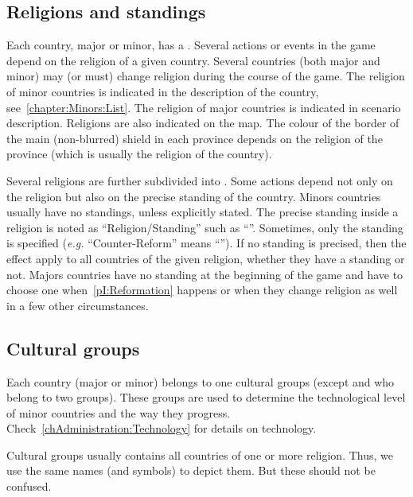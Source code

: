\label{chThePowers:Religions}



\subsection{Religions and standings}

\aparag Each country, major or minor, has a .
\bparag Several actions or events in the game depend on the religion of a
given country.
\bparag Several countries (both major and minor) may (or must) change religion
during the course of the game.
\bparag The religion of minor countries is indicated in the description of the
country, see~\ref{chapter:Minors:List}. The religion of major countries is
indicated in scenario description.
\bparag Religions are also indicated on the map. The colour of the border of
the main (non-blurred) shield in each province depends on the religion of the
province (which is usually the religion of the country).

\aparag Several religions are further subdivided into . Some
actions depend not only on the religion but also on the precise standing of
the country.
\bparag Minors countries usually have no standings, unless explicitly stated.
\bparag The precise standing inside a religion is noted as
``Religion/Standing'' such as ``\CATHCR''. Sometimes, only the standing is
specified (\emph{e.g.} ``Counter-Reform'' means ``\CATHCR'').
\bparag If no standing is precised, then the effect apply to all countries of
the given religion, whether they have a standing or not.
\bparag Majors countries have no standing at the beginning of the game and
have to choose one when~\ref{pI:Reformation} happens or when they change
religion as well in a few other circumstances.



\subsection{Cultural groups}

\aparag Each country (major or minor) belongs to one cultural groups (except
\POL and \RUS who belong to two groups).
\bparag These groups are used to determine the technological level of minor
countries and the way they progress. Check~\ref{chAdministration:Technology}
for details on technology.

\aparag Cultural groups usually contains all countries of one or more
religion. Thus, we use the same names (and symbols) to depict them. But these
should not be confused.

